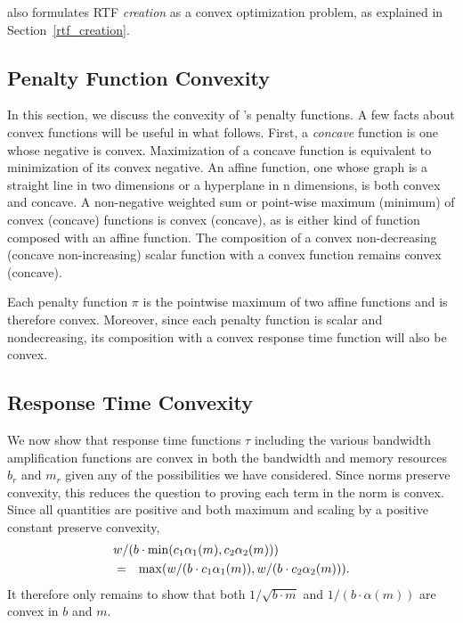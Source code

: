 \pacora also formulates RTF \emph{creation} as a convex optimization
problem, as explained in Section~\ref{rtf_creation}.

\subsection{Penalty Function Convexity}
In this section, we discuss the convexity of \pacora's penalty functions.
A few facts about convex functions will be useful in what follows.
First, a \emph{concave} function is one whose negative is convex.
Maximization of a concave function is equivalent to minimization of its convex negative.
An affine function, one whose graph is a straight line in two dimensions or a hyperplane in n dimensions,
is both convex and concave.  A non-negative weighted sum or point-wise maximum (minimum) of convex (concave) functions is convex (concave), as is either kind of function composed with an affine function.  The composition of a convex non-decreasing (concave non-increasing) scalar function with a convex function remains convex (concave).

Each penalty function $\pi$ is the pointwise maximum of two affine functions and is therefore convex.
Moreover, since each penalty function is scalar and nondecreasing,
its composition with a convex response time function will also be convex.

\subsection{Response Time Convexity}
We now show that response time functions $\tau$ including the various bandwidth amplification functions are convex
in both the bandwidth and memory resources $b_r$ and $m_r$ given any of the possibilities we have considered.
Since norms preserve convexity, this reduces the question to proving each term in the norm is convex.
Since all quantities are positive and both maximum and scaling by a positive constant preserve convexity,
\begin{eqnarray*}
\lefteqn{w/(b\cdot\min(c_1\alpha_1(m),c_2\alpha_2(m)))}   \\
&=& \max(w/(b\cdot c_1\alpha_1(m)),w/(b\cdot c_2\alpha_2(m))).
\end{eqnarray*}
It therefore only remains to show that both $1/\sqrt{b\cdot m}$ and $1/(b\cdot\alpha(m))$ are convex in $b$ and $m$.

